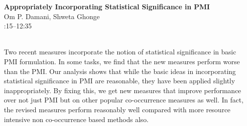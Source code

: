 \documentclass[twoside,makeidx]{book}
\renewcommand{\normalsize}{\fontsize{8}{9}\selectfont}
\renewcommand{\small}{\fontsize{7}{8}\selectfont}
\begin{document}
\par\vspace{2em}\noindent%
\begin{minipage}{\linewidth}%
\begin{center}
\textbf{\normalsize Appropriately Incorporating Statistical Significance in PMI}\\
\normalsize  Om P. Damani,  Shweta Ghonge\\
{\small 12:15--12:35}\\
\end{center}
\end{minipage}\\[0.5em]
\nopagebreak%
\noindent%
{\small Two recent measures incorporate the notion of statistical significance in basic PMI formulation. In some tasks, we find that the new measures perform worse than the PMI. Our analysis shows that while the basic ideas in incorporating statistical significance in PMI are reasonable, they have been applied slightly inappropriately. By fixing this, we get new measures that improve performance over not just PMI but on other popular co-occurrence measures as well. In fact, the revised measures perform reasonably well compared with more resource intensive non co-occurrence based methods also.}
\clearpage
\end{document}
